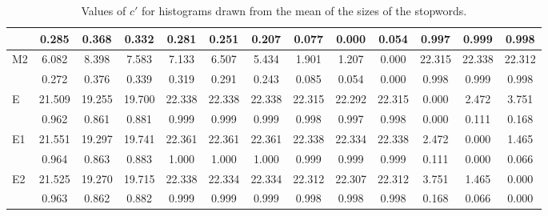 \begin{table*}[h!]
\begin{center}
\begin{tabular}{| l | c | c | c | c | c | c | c | c | c | c | c | c |}
 & 0.285  & 0.368  & 0.332  & 0.281  & 0.251  & 0.207  & 0.077  & 0.000  & 0.054  & 0.997  & 0.999  & 0.998 \\\hline
M2 & 6.082  & 8.398  & 7.583  & 7.133  & 6.507  & 5.434  & 1.901  & 1.207  & 0.000  & 22.315  & 22.338  & 22.312 \\\hline
 & 0.272  & 0.376  & 0.339  & 0.319  & 0.291  & 0.243  & 0.085  & 0.054  & 0.000  & 0.998  & 0.999  & 0.998 \\\hline
E & 21.509  & 19.255  & 19.700  & 22.338  & 22.338  & 22.338  & 22.315  & 22.292  & 22.315  & 0.000  & 2.472  & 3.751 \\\hline
 & 0.962  & 0.861  & 0.881  & 0.999  & 0.999  & 0.999  & 0.998  & 0.997  & 0.998  & 0.000  & 0.111  & 0.168 \\\hline
E1 & 21.551  & 19.297  & 19.741  & 22.361  & 22.361  & 22.361  & 22.338  & 22.334  & 22.338  & 2.472  & 0.000  & 1.465 \\\hline
 & 0.964  & 0.863  & 0.883  & 1.000  & 1.000  & 1.000  & 0.999  & 0.999  & 0.999  & 0.111  & 0.000  & 0.066 \\\hline
E2 & 21.525  & 19.270  & 19.715  & 22.338  & 22.334  & 22.334  & 22.312  & 22.307  & 22.312  & 3.751  & 1.465  & 0.000 \\\hline
 & 0.963  & 0.862  & 0.882  & 0.999  & 0.999  & 0.999  & 0.998  & 0.998  & 0.998  & 0.168  & 0.066  & 0.000 \\\hline
\end{tabular}
\caption{Values of $c'$ for histograms drawn from the mean of the sizes of the stopwords.}
\end{center}
\end{table*}